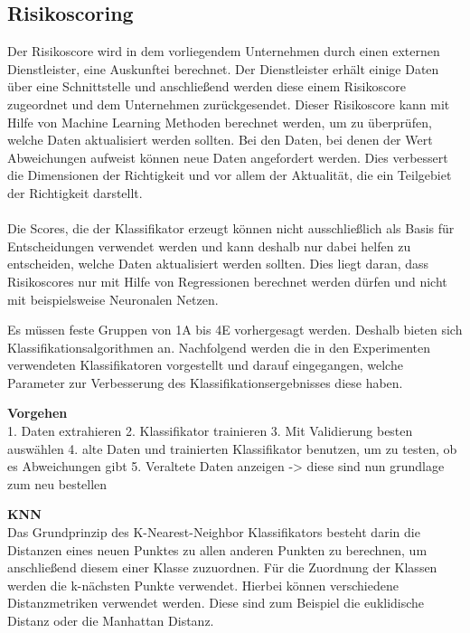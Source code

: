 \subsection{Risikoscoring}
Der Risikoscore wird in dem vorliegendem Unternehmen durch einen externen Dienstleister, eine Auskunftei berechnet. 
Der Dienstleister erhält einige Daten über eine Schnittstelle und anschließend werden diese einem Risikoscore zugeordnet und dem Unternehmen zurückgesendet.
Dieser Risikoscore kann mit Hilfe von Machine Learning Methoden berechnet werden, um zu überprüfen, welche Daten aktualisiert werden sollten.
Bei den Daten, bei denen der Wert Abweichungen aufweist können neue Daten angefordert werden.
Dies verbessert die Dimensionen der Richtigkeit und vor allem der Aktualität, die ein Teilgebiet der Richtigkeit darstellt.
\\ \\
Die Scores, die der Klassifikator erzeugt können nicht ausschließlich als Basis für Entscheidungen verwendet werden und kann deshalb nur dabei helfen zu entscheiden, welche Daten aktualisiert werden sollten.
Dies liegt daran, dass Risikoscores nur mit Hilfe von Regressionen berechnet werden dürfen und nicht mit beispielsweise Neuronalen Netzen.





Es müssen feste Gruppen von 1A bis 4E vorhergesagt werden. Deshalb bieten sich Klassifikationsalgorithmen an.
Nachfolgend werden die in den Experimenten verwendeten Klassifikatoren vorgestellt und darauf eingegangen, welche Parameter zur Verbesserung des Klassifikationsergebnisses diese haben.



\textbf{Vorgehen} \\
1. Daten extrahieren
2. Klassifikator trainieren 
3. Mit Validierung besten auswählen
4. alte Daten und trainierten Klassifikator benutzen, um zu testen, ob es Abweichungen gibt
5. Veraltete Daten anzeigen -> diese sind nun grundlage zum neu bestellen

\textbf{KNN} \\
Das Grundprinzip des K-Nearest-Neighbor Klassifikators besteht darin die Distanzen eines neuen Punktes zu allen anderen Punkten zu berechnen, um anschließend diesem einer Klasse zuzuordnen.
Für die Zuordnung der Klassen werden die k-nächsten Punkte verwendet.
Hierbei können verschiedene Distanzmetriken verwendet werden. 
Diese sind zum Beispiel die euklidische Distanz oder die Manhattan Distanz.


